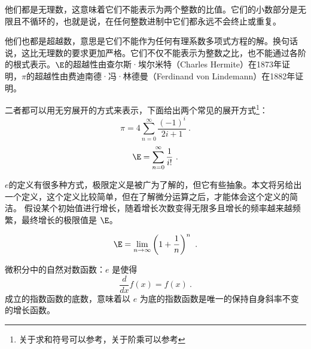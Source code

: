 他们都是无理数，这意味着它们不能表示为两个整数的比值。它们的小数部分是无限且不循环的，也就是说，在任何整数进制中它们都永远不会终止或重复。

他们也都是超越数，意思是它们不能作为任何有理系数多项式方程的解。换句话说，这比无理数的要求更加严格。它们不仅不能表示为整数之比，也不能通过各阶的根式表示。$\E$的超越性由查尔斯·埃尔米特（Charles Hermite）在1873年证明，$\pi$的超越性由费迪南德·冯·林德曼（Ferdinand von Lindemann）在1882年证明。

二者都可以用无穷展开的方式来表示，下面给出两个常见的展开方式\footnote{关于求和符号可以参考，关于阶乘可以参考}：
\begin{equation}
\pi=4\sum_{n=0}^\infty\frac{(-1)^i}{2i+1}~.
\end{equation}
\begin{equation}
\E=\sum_{n=0}^\infty\frac{1}{i!}~.
\end{equation}

$e$的定义有很多种方式，极限定义是被广为了解的，但它有些抽象。本文将另给出一个定义，这个定义比较简单，但在了解微分运算之后，才能体会这个定义的简洁。
假设某个初始值进行增长，随着增长次数变得无限多且增长的频率越来越频繁，最终增长的极限值是 $\E$。

\begin{equation}
\E = \lim_{n \to \infty} \left( 1 + \frac{1}{n} \right)^n~.
\end{equation}


微积分中的自然对数函数：$e$ 是使得
\begin{equation}
\frac{d}{dx} f(x) = f(x)~.
\end{equation}
成立的指数函数的底数，意味着以 $e$ 为底的指数函数是唯一的保持自身斜率不变的增长函数。

